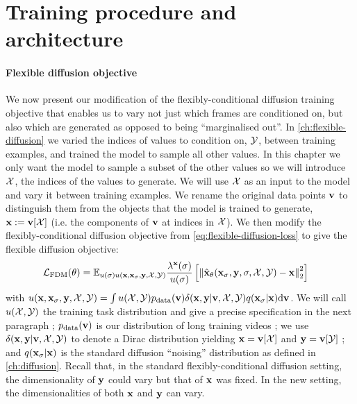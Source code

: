 \section{Training procedure and architecture} \label{sec:fdm-method}

\paragraph{Flexible diffusion objective}
We now present our modification of the flexibly-conditional diffusion training objective that enables us to vary not just which frames are conditioned on, but also which are generated as opposed to being ``marginalised out''. In \cref{ch:flexible-diffusion} we varied the indices of values to condition on, ${\mathcal{Y}}$, between training examples, and trained the model to sample all other values. In this chapter we only want the model to sample a subset of the other values so we will introduce ${\mathcal{X}}$, the indices of the values to generate. We will use ${\mathcal{X}}$ as an input to the model and vary it between training examples. We rename the original data points ${\mathbf{v}}$ to distinguish them from the objects that the model is trained to generate, ${\mathbf{x}} := {\mathbf{v}}[{\mathcal{X}}]$ (i.e. the components of ${\mathbf{v}}$ at indices in ${\mathcal{X}}$). We then modify the flexibly-conditional diffusion objective from \cref{eq:flexible-diffusion-loss} to give the flexible diffusion objective:
\begin{align} \label{eq:fdm-loss}
    \mathcal{L}_\text{FDM}(\theta) &= 
    \mathbb{E}_{u(\sigma) u({\mathbf{x}}, {\mathbf{x}}_\sigma, {\mathbf{y}}, {\mathcal{X}}, {\mathcal{Y}})} \frac{\lambda^{\mathbf{x}}(\sigma)}{u(\sigma)} \left[ 
    \left\| \hat{{\mathbf{x}}}_\theta({\mathbf{x}}_\sigma, {\mathbf{y}}, \sigma, {\mathcal{X}}, {\mathcal{Y}}) - {\mathbf{x}} \right\|_2^2 \right]
\end{align}
with $u({\mathbf{x}}, {\mathbf{x}}_\sigma, {\mathbf{y}}, {\mathcal{X}}, {\mathcal{Y}}) = \int u({\mathcal{X}}, {\mathcal{Y}})p_{\rm{data}}({\mathbf{v}})\delta({\mathbf{x}},{\mathbf{y}}|{\mathbf{v}},{\mathcal{X}},{\mathcal{Y}})q({\mathbf{x}}_\sigma|{\mathbf{x}}) \mathrm{d}{\mathbf{v}}$. We will call $u({\mathcal{X}}, {\mathcal{Y}})$ the training task distribution and give a precise specification in the next paragraph ; $p_{\rm{data}}({\mathbf{v}})$ is our distribution of long training videos ; we use $\delta({\mathbf{x}},{\mathbf{y}}|{\mathbf{v}},{\mathcal{X}},{\mathcal{Y}})$ to denote a Dirac distribution yielding ${\mathbf{x}} = {\mathbf{v}}[{\mathcal{X}}]$ and ${\mathbf{y}} = {\mathbf{v}}[{\mathcal{Y}}]$ ; and $q({\mathbf{x}}_\sigma | {\mathbf{x}})$ is the standard diffusion ``noising'' distribution as defined in \cref{ch:diffusion}. Recall that, in the standard flexibly-conditional diffusion setting, the dimensionality of ${\mathbf{y}}$ could vary but that of ${\mathbf{x}}$ was fixed. In the new setting, the dimensionalities of both ${\mathbf{x}}$ and ${\mathbf{y}}$ can vary.

